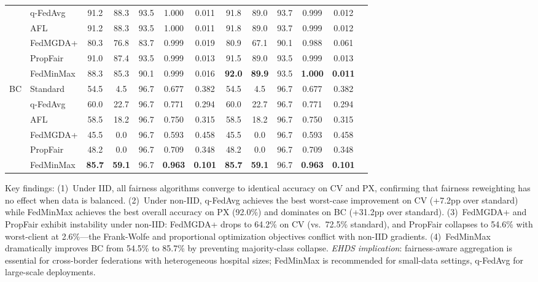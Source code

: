 \documentclass[conference]{IEEEtran}
\begin{document}
\begin{table}[htbp]
{\begin{tabular}{llccccccccccc}
 & q-FedAvg & 91.2 & 88.3 & 93.5 & 1.000 & 0.011 & 91.8 & 89.0 & 93.7 & 0.999 & 0.012 \\
 & AFL & 91.2 & 88.3 & 93.5 & 1.000 & 0.011 & 91.8 & 89.0 & 93.7 & 0.999 & 0.012 \\
 & FedMGDA+ & 80.3 & 76.8 & 83.7 & 0.999 & 0.019 & 80.9 & 67.1 & 90.1 & 0.988 & 0.061 \\
 & PropFair & 91.0 & 87.4 & 93.5 & 0.999 & 0.013 & 91.5 & 89.0 & 93.5 & 0.999 & 0.013 \\
 & FedMinMax & 88.3 & 85.3 & 90.1 & 0.999 & 0.016 & \textbf{92.0} & \textbf{89.9} & 93.5 & \textbf{1.000} & \textbf{0.011} \\
\midrule
\multirow{6}{*}{BC} & Standard & 54.5 & 4.5 & 96.7 & 0.677 & 0.382 & 54.5 & 4.5 & 96.7 & 0.677 & 0.382 \\
 & q-FedAvg & 60.0 & 22.7 & 96.7 & 0.771 & 0.294 & 60.0 & 22.7 & 96.7 & 0.771 & 0.294 \\
 & AFL & 58.5 & 18.2 & 96.7 & 0.750 & 0.315 & 58.5 & 18.2 & 96.7 & 0.750 & 0.315 \\
 & FedMGDA+ & 45.5 & 0.0 & 96.7 & 0.593 & 0.458 & 45.5 & 0.0 & 96.7 & 0.593 & 0.458 \\
 & PropFair & 48.2 & 0.0 & 96.7 & 0.709 & 0.348 & 48.2 & 0.0 & 96.7 & 0.709 & 0.348 \\
 & FedMinMax & \textbf{85.7} & \textbf{59.1} & 96.7 & \textbf{0.963} & \textbf{0.101} & \textbf{85.7} & \textbf{59.1} & 96.7 & \textbf{0.963} & \textbf{0.101} \\
\bottomrule
\end{tabular}%
}

\vspace{1mm}
\footnotesize{Key findings: (1)~Under IID, all fairness algorithms converge to identical accuracy on CV and PX, confirming that fairness reweighting has no effect when data is balanced. (2)~Under non-IID, q-FedAvg achieves the best worst-case improvement on CV (+7.2pp over standard) while FedMinMax achieves the best overall accuracy on PX (92.0\%) and dominates on BC (+31.2pp over standard). (3)~FedMGDA+ and PropFair exhibit instability under non-IID: FedMGDA+ drops to 64.2\% on CV (vs.\ 72.5\% standard), and PropFair collapses to 54.6\% with worst-client at 2.6\%---the Frank-Wolfe and proportional optimization objectives conflict with non-IID gradients. (4)~FedMinMax dramatically improves BC from 54.5\% to 85.7\% by preventing majority-class collapse. \textit{EHDS implication}: fairness-aware aggregation is essential for cross-border federations with heterogeneous hospital sizes; FedMinMax is recommended for small-data settings, q-FedAvg for large-scale deployments.}
\end{table}
\end{document}
